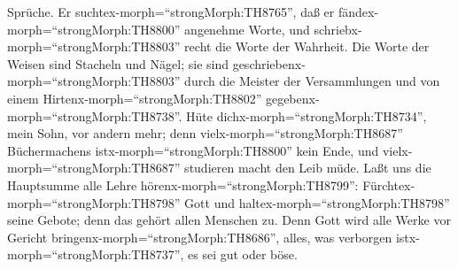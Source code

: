 Sprüche.  Er suchtex-morph=``strongMorph:TH8765'', daß er
fändex-morph=``strongMorph:TH8800'' angenehme Worte, und
schriebx-morph=``strongMorph:TH8803'' recht die Worte der Wahrheit.
 Die Worte der Weisen sind Stacheln und Nägel; sie sind
geschriebenx-morph=``strongMorph:TH8803'' durch die Meister der
Versammlungen und von einem Hirtenx-morph=``strongMorph:TH8802''
gegebenx-morph=``strongMorph:TH8738''.  Hüte
dichx-morph=``strongMorph:TH8734'', mein Sohn, vor andern mehr; denn
vielx-morph=``strongMorph:TH8687'' Büchermachens
istx-morph=``strongMorph:TH8800'' kein Ende, und
vielx-morph=``strongMorph:TH8687'' studieren macht den Leib müde.
 Laßt uns die Hauptsumme alle Lehre
hörenx-morph=``strongMorph:TH8799'':
Fürchtex-morph=``strongMorph:TH8798'' Gott und
haltex-morph=``strongMorph:TH8798'' seine Gebote; denn das gehört allen
Menschen zu.  Denn Gott wird alle Werke vor Gericht
bringenx-morph=``strongMorph:TH8686'', alles, was verborgen
istx-morph=``strongMorph:TH8737'', es sei gut oder böse.
